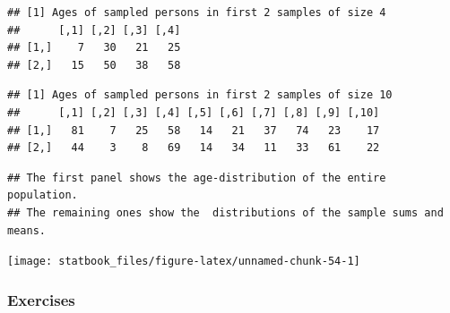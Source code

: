 \documentclass[]{book}
\begin{document}
\begin{verbatim}
## [1] Ages of sampled persons in first 2 samples of size 4
##      [,1] [,2] [,3] [,4]
## [1,]    7   30   21   25
## [2,]   15   50   38   58
\end{verbatim}

\begin{verbatim}
## [1] Ages of sampled persons in first 2 samples of size 10
##      [,1] [,2] [,3] [,4] [,5] [,6] [,7] [,8] [,9] [,10]
## [1,]   81    7   25   58   14   21   37   74   23    17
## [2,]   44    3    8   69   14   34   11   33   61    22
\end{verbatim}

\begin{verbatim}
## The first panel shows the age-distribution of the entire population.
## The remaining ones show the  distributions of the sample sums and means.
\end{verbatim}

\begin{center}\texttt{[image: statbook\_files/figure-latex/unnamed-chunk-54-1]} \end{center}

\hypertarget{exercises-3}{%
\subsubsection{Exercises}\label{exercises-3}}
\end{document}
